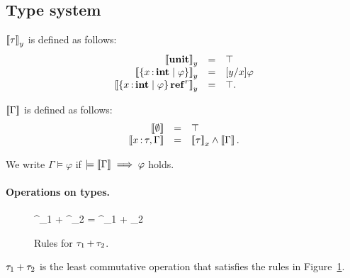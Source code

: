 \documentclass[runningheads]{llncs}
\begin{document}
\subsection{Type system}

\begin{definition}
  $\left\llbracket{\tau}\right\rrbracket_y$ is defined as follows:
  \[
    \begin{array}{rcl}
      \left\llbracket{\mathbf{unit}}\right\rrbracket_y &=& \top\\
      \left\llbracket{\left\{{x \operatorname{:}\mathbf{int}\mid \varphi}\right\}}\right\rrbracket_y &=& [y/x]\varphi\\
      \left\llbracket{\left\{{x \operatorname{:}\mathbf{int}\mid \varphi}\right\} \operatorname{\mathbf{ref}}^{r}}\right\rrbracket_y &=& \top.
    \end{array}
  \]
\end{definition}

\begin{definition}
  $\left\llbracket{\Gamma}\right\rrbracket$ is defined as follows:
  \[
    \begin{array}{rcl}
      \left\llbracket{\emptyset}\right\rrbracket &=& \top\\
      \left\llbracket{x\operatorname{:}\tau, \Gamma}\right\rrbracket &=& \left\llbracket{\tau}\right\rrbracket_x \land \left\llbracket{\Gamma}\right\rrbracket.
    \end{array}
  \]
\end{definition}

\begin{definition}
  We write $\Gamma \models \varphi$ if $\models \left\llbracket{\Gamma}\right\rrbracket \implies \varphi$ holds.
\end{definition}

\paragraph{Operations on types.}

\begin{figure}[t]
  { \TREF^{\ownership_1} +  \TREF^{\ownership_2} =  \TREF^{\ownership_1 + \ownership_2}}


  \caption{Rules for $\tau_1 \operatorname{+} \tau_2$.}
  \label{fig:addition}
\end{figure}

\begin{definition}
  $\tau_1 + \tau_2$ is the least commutative operation that satisfies the rules in Figure~\ref{fig:addition}.
\end{definition}
\end{document}
